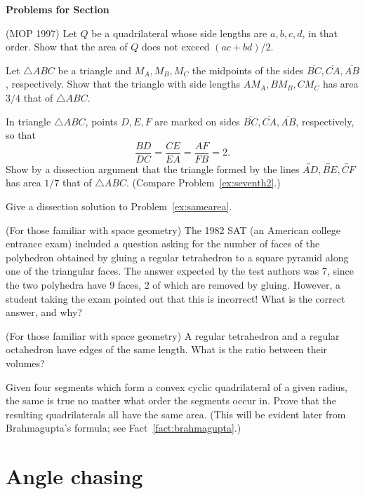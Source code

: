 \documentclass[12pt]{book}
\newcounter{exc}
\numberwithin{exc}{section}
\numberwithin{figure}{section}
\newenvironment{exer}{\vspace{0.1in}
\noindent \textbf{Problems for Section~\thesection} \vspace{0.1in}
\begin{list}{\arabic{exc}.}{\usecounter{exc}}}{\end{list}}
\numberwithin{equation}{theorem}
\def\ii{\item}
\def\line#1{\overleftrightarrow{#1}}
\def\seg#1{\overline{#1}}
\begin{document}
\begin{exer}
\ii
(MOP 1997)
Let $Q$ be a quadrilateral whose side lengths are $a,b,c,d$, in that
order. Show that the area of $Q$ does not exceed $(ac+bd)/2$.
\ii
Let $\triangle ABC$ be a triangle and $M_{A}, M_{B}, M_{C}$ the midpoints of the 
sides $\seg{BC}, \seg{CA}, \seg{AB}$, respectively. Show that the triangle 
with side 
lengths $AM_{A}, BM_{B}, CM_{C}$ has area $3/4$ that of 
$\triangle ABC$.
\ii \label{ex:seventh}
In triangle $\triangle ABC$, points $D, E, F$ are marked on sides $\seg{BC}, \seg{CA}, 
\seg{AB}$, 
respectively, so that
\[
\frac{BD}{DC} = \frac{CE}{EA} = \frac{AF}{FB} = 2.
\]
Show by a dissection argument that the triangle formed by the lines 
$\line{AD}, \line{BE}, \line{CF}$ has area $1/7$ 
that of $\triangle ABC$. (Compare Problem~\ref{ex:seventh2}.)
\ii
Give a dissection solution to Problem~\ref{ex:samearea}.
\ii
(For those familiar with space geometry)
The 1982 SAT (an American college entrance exam) 
 included 
a question asking for
the number of faces of the polyhedron obtained by gluing 
a regular tetrahedron to a square pyramid along one of the triangular 
faces. The answer expected by the test authors was 7,
since the two polyhedra have 9 faces, 2 of which are removed by 
gluing. However, a student taking the exam pointed out that this
is incorrect! What is the correct answer, and why?
\ii \label{ex:tetocta}
(For those familiar with space geometry)
A regular tetrahedron and a regular octahedron have edges of the same
length. What is the ratio between their volumes?
\ii
Given four segments which form a convex cyclic quadrilateral of
a given radius, the same is true no matter what order the segments occur in.
Prove that the resulting quadrilaterals all have the same area.
(This will be evident later from Brahmagupta's formula;
see Fact~\ref{fact:brahmagupta}.) 
\end{exer}

\section{Angle chasing}
\label{sec:angle chasing}
\end{document}
